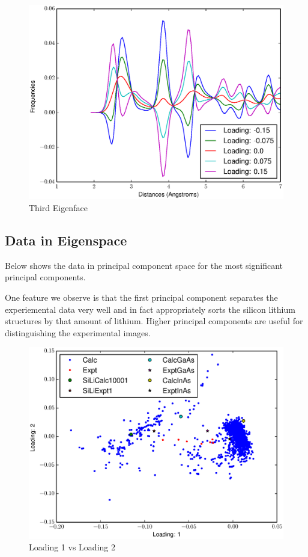 \documentclass[12pt,letterpaper]{article}
\begin{document}
\begin{figure}[ht]
  \begin{center}
    \includegraphics[scale=0.8]{figs/eigenface3.eps}
    \caption{Third Eigenface}
  \end{center}
\end{figure}
\clearpage

\subsection{Data in Eigenspace}
Below shows the data in principal component space for the most significant
principal components.

One feature we observe is that the first principal component separates the
experiemental data very well and in fact appropriately sorts the silicon lithium
structures by that amount of lithium. Higher principal components are useful for
distinguishing the experimental images.

\begin{figure}[ht]
  \begin{center}
    \includegraphics[scale=0.8]{figs/eigenspace1-2.eps}
    \caption{Loading 1 vs  Loading 2}
  \end{center}
\end{figure}
\end{document}
